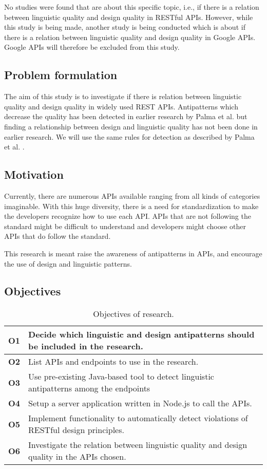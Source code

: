 No studies were found that are about this specific topic, i.e., if there is a relation between linguistic quality and design quality in RESTful APIs. However, while this study is being made, another study is being conducted which is about if there is a relation between linguistic quality and design quality in Google APIs. Google APIs will therefore be excluded from this study.

\subsection{Problem formulation}
The aim of this study is to investigate if there is relation between  linguistic quality and design quality in widely used REST APIs. Antipatterns which decrease the quality has been detected in earlier research by Palma et al. \cite{linguistic}\cite{design} but finding a relationship between design and linguistic quality has not been done in earlier research. We will use the same rules for detection as described by Palma et al. \cite{linguistic} \cite{design}.


\subsection{Motivation}
Currently, there are numerous APIs available ranging from all kinds of categories imaginable. With this huge diversity, there is a need for standardization to make the developers recognize how to use each API. APIs that are not following the standard might be difficult to understand and developers might choose other APIs that do follow the standard.

This research is meant raise the awareness of antipatterns in APIs, and encourage the use of design and linguistic patterns. 

\subsection{Objectives}


\begin{table}[!ht]
\begin{center}
\begin{tabular} {|p{1.2cm}|p{11.6cm}|} \hline
\textbf{O1} & Decide which linguistic and design antipatterns should be included in the research. \\ \hline
\textbf{O2} & List APIs and endpoints to use in the research. \\ \hline
\textbf{O3} & Use pre-existing Java-based tool to detect linguistic antipatterns among the endpoints \\ \hline
\textbf{O4} & Setup a server application written in Node.js to call the APIs. \\ \hline
\textbf{O5} & Implement functionality to automatically detect violations of RESTful design principles.\\ \hline
\textbf{O6} & Investigate the relation between linguistic quality and design quality in the APIs chosen. \\ \hline
\end{tabular}
 \caption{Objectives of research.}
 \label{tab:Objectives}
\end{center} 
\end{table}

